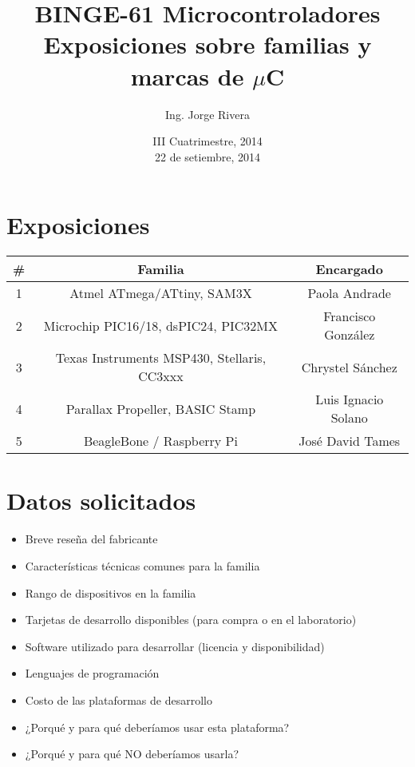 \documentclass[letterpaper,10pt]{article}
\title{BINGE-61 Microcontroladores\\ Exposiciones sobre familias y marcas de $\mu$C}
\author{Ing. Jorge Rivera}
\date{III Cuatrimestre, 2014\\ 22 de setiembre, 2014}
\begin{document}
\maketitle

\section{Exposiciones}

\begin{center}
\begin{tabular}{|c|c|c|}\hline


\#  & Familia 					& Encargado	\\ \hline\hline
1   & Atmel ATmega/ATtiny, SAM3X	 		& Paola Andrade   \\[.2cm]\hline
2   & Microchip PIC16/18, dsPIC24, PIC32MX	& Francisco González\\[.2cm]\hline
3   & Texas Instruments MSP430, Stellaris, CC3xxx & Chrystel Sánchez 	\\[.2cm]\hline
4   & Parallax Propeller, BASIC Stamp	& Luis Ignacio Solano	\\[.2cm]\hline
5   & BeagleBone / Raspberry Pi			& José David Tames \\[.2cm]\hline


\end{tabular}
\end{center}

\section{Datos solicitados}
\begin{small}
\begin{itemize}
\item Breve reseña del fabricante
\item Características técnicas comunes para la familia
\item Rango de dispositivos en la familia
\item Tarjetas de desarrollo disponibles (para compra o en el laboratorio)
\item Software utilizado para desarrollar (licencia y disponibilidad)
\item Lenguajes de programación
\item Costo de las plataformas de desarrollo
\item ¿Porqué y para qué deberíamos usar esta plataforma?
\item ¿Porqué y para qué NO deberíamos usarla?
\end{itemize}
\end{small}
\end{document}
